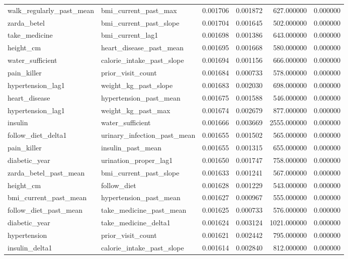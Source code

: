 \begin{longtable}{llrrrr}
walk\_regularly\_past\_mean & bmi\_current\_past\_max & 0.001706 & 0.001872 & 627.000000 & 0.000000 \\
zarda\_betel & bmi\_current\_past\_slope & 0.001704 & 0.001645 & 502.000000 & 0.000000 \\
take\_medicine & bmi\_current\_lag1 & 0.001698 & 0.001386 & 643.000000 & 0.000000 \\
height\_cm & heart\_disease\_past\_mean & 0.001695 & 0.001668 & 580.000000 & 0.000000 \\
water\_sufficient & calorie\_intake\_past\_slope & 0.001694 & 0.001156 & 666.000000 & 0.000000 \\
pain\_killer & prior\_visit\_count & 0.001684 & 0.000733 & 578.000000 & 0.000000 \\
hypertension\_lag1 & weight\_kg\_past\_slope & 0.001683 & 0.002030 & 698.000000 & 0.000000 \\
heart\_disease & hypertension\_past\_mean & 0.001675 & 0.001588 & 546.000000 & 0.000000 \\
hypertension\_lag1 & weight\_kg\_past\_max & 0.001674 & 0.002679 & 877.000000 & 0.000000 \\
insulin & water\_sufficient & 0.001666 & 0.003669 & 2555.000000 & 0.000000 \\
follow\_diet\_delta1 & urinary\_infection\_past\_mean & 0.001655 & 0.001502 & 565.000000 & 0.000000 \\
pain\_killer & insulin\_past\_mean & 0.001655 & 0.001315 & 655.000000 & 0.000000 \\
diabetic\_year & urination\_proper\_lag1 & 0.001650 & 0.001747 & 758.000000 & 0.000000 \\
zarda\_betel\_past\_mean & bmi\_current\_past\_slope & 0.001633 & 0.001241 & 567.000000 & 0.000000 \\
height\_cm & follow\_diet & 0.001628 & 0.001229 & 543.000000 & 0.000000 \\
bmi\_current\_past\_mean & hypertension\_past\_mean & 0.001627 & 0.000967 & 555.000000 & 0.000000 \\
follow\_diet\_past\_mean & take\_medicine\_past\_mean & 0.001625 & 0.000733 & 576.000000 & 0.000000 \\
diabetic\_year & take\_medicine\_delta1 & 0.001624 & 0.003124 & 1021.000000 & 0.000000 \\
hypertension & prior\_visit\_count & 0.001621 & 0.002442 & 795.000000 & 0.000000 \\
insulin\_delta1 & calorie\_intake\_past\_slope & 0.001614 & 0.002840 & 812.000000 & 0.000000 \\

\end{longtable}
